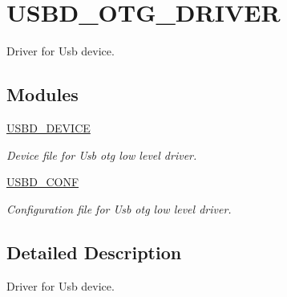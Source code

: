 \hypertarget{group__USBD__OTG__DRIVER}{}\section{U\+S\+B\+D\+\_\+\+O\+T\+G\+\_\+\+D\+R\+I\+V\+ER}
\label{group__USBD__OTG__DRIVER}


Driver for Usb device.  


\subsection*{Modules}
\begin{DoxyCompactItemize}
\item 
\hyperlink{group__USBD__DEVICE}{U\+S\+B\+D\+\_\+\+D\+E\+V\+I\+CE}
\begin{DoxyCompactList}\small\item\em Device file for Usb otg low level driver. \end{DoxyCompactList}\item 
\hyperlink{group__USBD__CONF}{U\+S\+B\+D\+\_\+\+C\+O\+NF}
\begin{DoxyCompactList}\small\item\em Configuration file for Usb otg low level driver. \end{DoxyCompactList}\end{DoxyCompactItemize}


\subsection{Detailed Description}
Driver for Usb device. 


